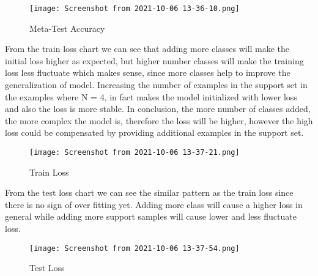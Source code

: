 \documentclass[]{article}
\begin{document}
	\begin{center} 
		\begin{figure}[H]
			\centering
			\texttt{[image: Screenshot from 2021-10-06 13-36-10.png]}
			\caption{Meta-Test Accuracy}
		\end{figure}	
	\end{center}
	
	From the train loss chart we can see that adding more classes will make the initial loss higher as expected, but higher number classes will make the training loss less fluctuate which makes sense, since more classes help to improve the generalization of model. Increasing the number of examples in the support set in the examples where N = 4, in fact makes the model initialized with lower loss and also the loss is more stable. In conclusion, the more number of classes added, the more complex the model is, therefore the loss will be higher, however the high loss could be compensated by providing additional examples in the support set. 	
	
	\begin{center} 
		\begin{figure}[H]
			\centering
			\texttt{[image: Screenshot from 2021-10-06 13-37-21.png]}
			\caption{Train Loss}
		\end{figure}
	\end{center}

	From the test loss chart we can see the similar pattern as the train loss since there is no sign of over fitting yet. Adding more class will cause a higher loss in general while adding more support samples will cause lower and less fluctuate loss. 

	\begin{center} 
		\begin{figure}[H]
			\centering
			\texttt{[image: Screenshot from 2021-10-06 13-37-54.png]}
			\caption{Test Loss}
		\end{figure}
	\end{center}

	
\end{document}
